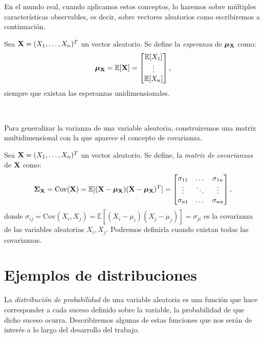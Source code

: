 \documentclass[oneside,openright,titlepage,numbers=noenddot,openany,headinclude,footinclude=true,
cleardoublepage=empty,abstractoff,BCOR=5mm,paper=a4,fontsize=12pt,main=spanish]{scrreprt}
\begin{document}
En el mundo real, cuando aplicamos estos conceptos, lo haremos sobre múltiples características observables, es decir, sobre vectores aleatorios como escribiremos a continuación.\\

\begin{definition}
Sea $\textbf{X}=(X_1,\dots,X_n)^T$ un vector aleatorio. Se define la \textit{esperanza} de $\bm{\mu_{\textbf{X}}}$ como: $$\bm{\mu_{\textbf{X}}}=\mathbb{E}[\textbf{X}]=\begin{bmatrix}
\mathbb{E}[X_1]\\
\vdots\\
\mathbb{E}[X_n]
\end{bmatrix},$$
siempre que existan las esperanzas unidimensionales.
\end{definition}\

Para generalizar la varianza de una variable aleatoria, construiremos una matriz multidimensional con la que aparece el concepto de covarianza.\\

\begin{definition}
Sea $\textbf{X}=(X_1,\dots,X_n)^T$ un vector aleatorio. Se define, la \textit{matriz de covarianzas} de $\textbf{X}$ como: $$\bm{\Sigma_{\textbf{X}}} = \text{Cov}(\textbf{X})=\mathbb{E}[(\textbf{X}-\bm{\mu_{\textbf{X}}})(\textbf{X}-\bm{\mu_{\textbf{X}}})^T]=\begin{bmatrix}
\sigma_{11} & \dots & \sigma_{1n}\\
\vdots & \ddots & \vdots\\
\sigma_{n1} & \dots & \sigma_{nn}
\end{bmatrix},$$
donde $\sigma_{ij}=\text{Cov}(X_i,X_j)=\mathbb{E}[(X_i-\mu_i)(X_j-\mu_j)]=\sigma_{ji}$ es la covarianza de las variables aleatorias $X_i,X_j$. Podremos definirla cuando existan todas las covarianzas.
\end{definition}

\section{Ejemplos de distribuciones}

La \textit{distribución de probabilidad} de una variable aleatoria es una función que hace corresponder a cada suceso definido sobre la variable, la probabilidad de que dicho suceso ocurra. Describiremos algunas de estas funciones que nos serán de interés a lo largo del desarrollo del trabajo.\\
\end{document}
